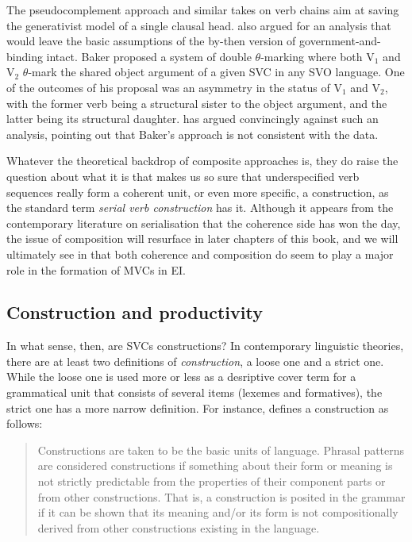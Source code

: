 The pseudocomplement approach and similar takes on verb chains aim at saving the generativist model of a single clausal head. \citet{baker1989object} also argued for an analysis that would leave the basic assumptions of the by-then version of government-and-binding intact. Baker proposed a system of double $\theta$-marking where both V$_1$ and V$_2$ $\theta$-mark the shared object argument of a given SVC in any SVO language. One of the outcomes of his proposal was an asymmetry in the status of V$_1$ and V$_2$, with the former verb being a structural sister to the object argument, and the latter being its structural daughter. \citet{Durie1997} has argued convincingly against such an analysis, pointing out that Baker's approach is not consistent with the data.

Whatever the theoretical backdrop of composite approaches is, they do raise the question about what it is that makes us so sure that underspecified verb sequences really form a coherent unit, or even more specific, a construction, as the standard term \textit{serial verb construction} has it. Although it appears from the contemporary literature on serialisation that the coherence side has won the day, the issue of composition will resurface in later chapters of this book, and we will ultimately see in  that both coherence and composition do seem to play a major role in the formation of MVCs in EI.

\subsection{Construction and productivity}\label{sec:construction}

In what sense, then, are SVCs constructions? In contemporary linguistic theories, there are at least two definitions of \textit{construction}, a loose one and a strict one. While the loose one is used more or less as a desriptive cover term for a grammatical unit that consists of several items (lexemes and formatives), the strict one has a more narrow definition. For instance, \citet[4]{goldberg1995constructions} defines a construction as follows: 

\begin{quote}Constructions are taken to be the basic units of language. Phrasal patterns are considered constructions if something about their form or meaning is not strictly predictable from the properties of their component parts or from other constructions. That is, a construction is posited in the grammar if it can be shown that its meaning and/or its form is not compositionally derived from other constructions existing in the language.\end{quote}

